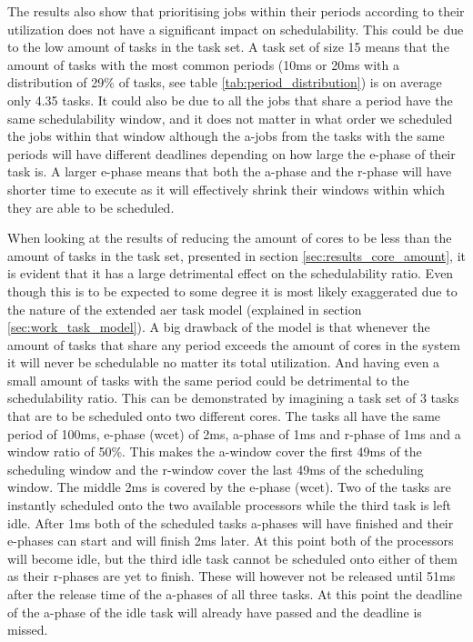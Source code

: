 \documentclass{kththesis}
\begin{document}
The results also show that prioritising jobs within their periods according to their utilization
does not have a significant impact on schedulability. This could be due to the low amount of tasks
in the task set. A task set of size 15 means that the amount of tasks with the most common periods
(10ms or 20ms with a distribution of 29\% of tasks, see table \ref{tab:period_distribution}) is on
average only 4.35 tasks. It could also be due to all the jobs that share a period have the same
schedulability window, and it does not matter in what order we scheduled the jobs within that
window although the \acrshort{a}-jobs from the tasks with the same periods will have different
deadlines depending on how large the \acrshort{e}-phase of their task is. A larger
\acrshort{e}-phase means that both the \acrshort{a}-phase and the \acrshort{r}-phase will have
shorter time to execute as it will effectively shrink their windows within which they are able to be
scheduled.

When looking at the results of reducing the amount of cores to be less than the amount of tasks in
the task set, presented in section \ref{sec:results_core_amount}, it is evident that it has a large
detrimental effect on the schedulability ratio. Even though this is to be expected to some degree it
is most likely exaggerated due to the nature of the extended \acrshort{aer} task model (explained in
section \ref{sec:work_task_model}). A big drawback of the model is that whenever the amount of tasks
that share any period exceeds the amount of cores in the system it will never be schedulable no
matter its total utilization. And having even a small amount of tasks with the same period could be 
detrimental to the schedulability ratio. This can be demonstrated by imagining a task set of 3 tasks
that are to be scheduled onto two different cores. The tasks all have the same period of 100ms,
\acrshort{e}-phase (\acrshort{wcet}) of 2ms, \acrshort{a}-phase of 1ms and \acrshort{r}-phase of 1ms
and a window ratio of 50\%. This makes the \acrshort{a}-window cover the first 49ms of the
scheduling window and the \acrshort{r}-window cover the last 49ms of the scheduling window. The
middle 2ms is covered by the \acrshort{e}-phase (\acrshort{wcet}). Two of the tasks are instantly
scheduled onto the two available processors while the third task is left idle. After 1ms both of the
scheduled tasks \acrshort{a}-phases will have finished and their \acrshort{e}-phases can start and
will finish 2ms later. At this point both of the processors will become idle, but the third idle task
cannot be scheduled onto either of them as their \acrshort{r}-phases are yet to finish. These will
however not be released until 51ms after the release time of the \acrshort{a}-phases of all three
tasks. At this point the deadline of the \acrshort{a}-phase of the idle task will already have
passed and the deadline is missed.
\end{document}
